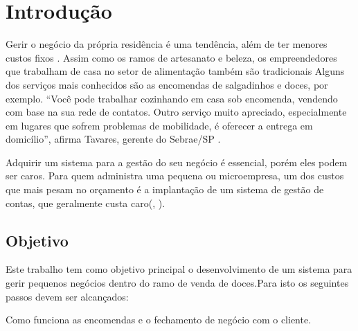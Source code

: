 
\chapter{Introdução}
\thispagestyle{empty}

Gerir o negócio da própria residência é uma tendência, além de ter menores custos fixos \cite{Fonseca}.
Assim como os ramos de artesanato e beleza, os empreendedores que trabalham de casa no setor de alimentação também são tradicionais
Alguns dos serviços mais conhecidos são as encomendas de salgadinhos e doces, por exemplo. “Você pode trabalhar cozinhando em casa sob encomenda, vendendo com base na sua rede de contatos. Outro serviço muito apreciado, especialmente em lugares que sofrem problemas de mobilidade, é oferecer a entrega em domicílio”, afirma Tavares, gerente do Sebrae/SP \cite{Fonseca}.

Adquirir um sistema para a gestão do seu negócio é essencial, porém eles podem ser caros. Para quem administra uma pequena ou microempresa, um dos custos que mais pesam no orçamento é a implantação de um sistema de gestão de contas, que geralmente custa caro(, \citeyear{Santana}).


\section{Objetivo} \label{sec:Objetivos}
Este trabalho tem como objetivo principal o desenvolvimento de um sistema para gerir pequenos negócios dentro do ramo de venda de doces.Para isto os seguintes passos devem ser alcançados:

\begin{itemsize}\itemEntender Como funciona as encomendas e o fechamento de negócio com o cliente.
\end{itemsize}

